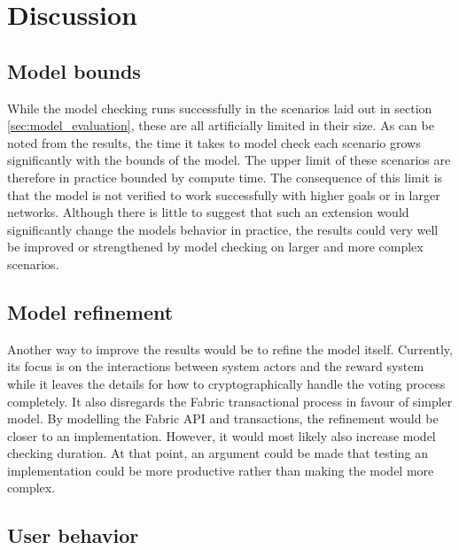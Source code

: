 \chapter{Discussion}
\label{ch:discussion}

\section{Model bounds}

While the model checking runs successfully in the scenarios laid out in section \ref{sec:model_evaluation}, these are all artificially limited in their size. As can be noted from the results, the time it takes to model check each scenario grows significantly with the bounds of the model. The upper limit of these scenarios are therefore in practice bounded by compute time. The consequence of this limit is that the model is not verified to work successfully with higher goals or in larger networks. Although there is little to suggest that such an extension would significantly change the models behavior in practice, the results could very well be improved or strengthened by model checking on larger and more complex scenarios.

\section{Model refinement}

Another way to improve the results would be to refine the model itself. Currently, its focus is on the interactions between system actors and the reward system while it leaves the details for how to cryptographically handle the voting process completely. It also disregards the Fabric transactional process in favour of simpler model. By modelling the Fabric API and transactions, the refinement would be closer to an implementation. However, it would most likely also increase model checking duration. At that point, an argument could be made that testing an implementation could be more productive rather than making the model more complex.


\section{User behavior}

